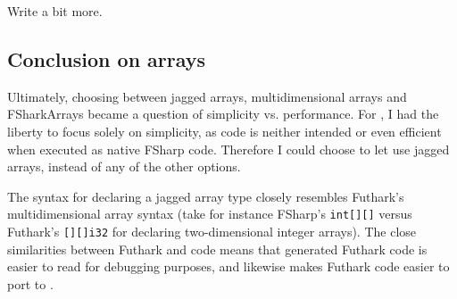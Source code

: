 Write a bit more.




\subsection{Conclusion on arrays}
Ultimately, choosing between jagged arrays, multidimensional arrays and
FSharkArrays became a question of simplicity vs. performance.
For \fshark{}, I had the liberty to focus solely on simplicity, as \fshark{}
code is neither intended or even efficient when executed as native FSharp code.
Therefore I could choose to let \fshark{} use jagged arrays, instead of any of
the other options.

The syntax for declaring a jagged array type closely
resembles Futhark's multidimensional array syntax (take for instance FSharp's
\texttt{int[][]} versus Futhark's \texttt{[][]i32} for declaring
two-dimensional integer arrays).
The close similarities between Futhark and \fshark{} code means that \fshark{}
generated Futhark code is easier to read for debugging purposes, and likewise
makes Futhark code easier to port to \fshark{}.

